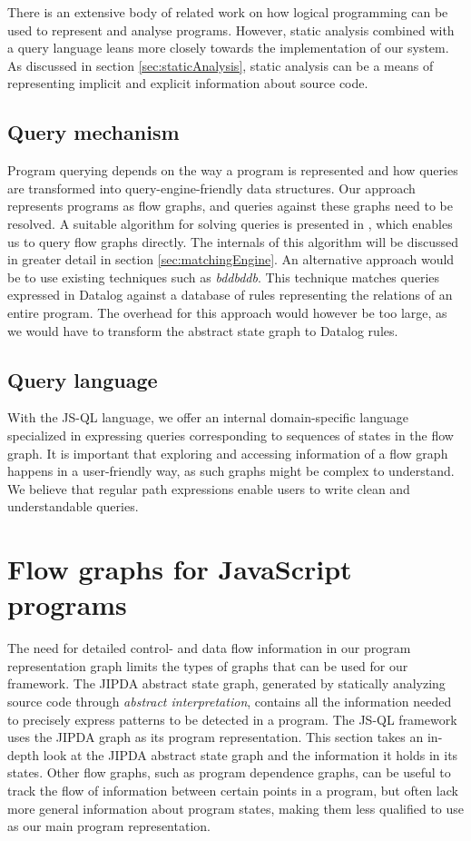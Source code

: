 There is an extensive body of related work on how logical programming can be used to represent and analyse programs\cite{Reps1995}\cite{DatalogDBQueries}. However, static analysis combined with a query language leans more closely towards the implementation of our system.  As discussed in section \ref{sec:staticAnalysis}, static analysis can be a means of representing implicit and explicit information about source code. 

\subsection*{Query mechanism}

Program querying depends on the way a program is represented and how queries are transformed into query-engine-friendly data structures. Our approach represents programs as flow graphs, and queries against these graphs need to be resolved. A suitable algorithm for solving queries is presented in \cite{algoEngine}, which enables us to query flow graphs directly. The internals of this algorithm will be discussed in greater detail in section \ref{sec:matchingEngine}. An alternative approach would be to use existing techniques such as \textit{bddbddb}\cite{bddbddb}. This technique matches queries expressed in Datalog against a database of rules representing the relations of an entire program. The overhead for this approach would however be too large, as we would have to transform the abstract state graph to Datalog rules.

\subsection*{Query language}
With the JS-QL language, we offer an internal domain-specific language specialized in expressing queries corresponding to sequences of states in the flow graph. It is important that exploring and accessing information of a flow graph happens in a user-friendly way, as such graphs might be complex to understand. We believe that regular path expressions enable users to write clean and understandable queries. 


\section{Flow graphs for JavaScript programs}
\label{sec:FlowGraphs}
The need for detailed control- and data flow information in our program representation graph limits the types of graphs that can be used for our framework. The JIPDA\cite{functionPurity} abstract state graph, generated by statically analyzing source code through \textit{abstract interpretation}, contains all the information needed to precisely express patterns to be detected in a program. The JS-QL framework uses the JIPDA graph as its program representation. This section takes an in-depth look at the JIPDA abstract state graph and the information it holds in its states. Other flow graphs, such as program dependence graphs\cite{PDG}, can be useful to track the flow of information between certain points in a program, but often lack more general information about program states, making them less qualified to use as our main program representation.

